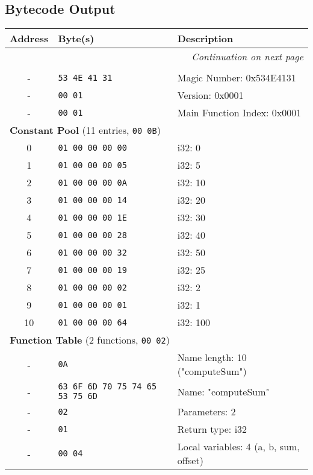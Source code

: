\documentclass[a4paper,12pt]{article}
\begin{document}
\subsection{Bytecode Output}
\begin{longtable}{|c|l|p{6cm}|}
\hline
\textbf{Address} & \textbf{Byte(s)} & \textbf{Description} \\ \hline
\endhead
\multicolumn{3}{r}{\textit{Continuation on next page}} \\
\endfoot
\endlastfoot
\multicolumn{3}{|l|}{\textbf{Header}} \\ \hline
  - & \texttt{53 4E 41 31} & Magic Number: 0x534E4131 \\ \hline
  - & \texttt{00 01} & Version: 0x0001 \\ \hline
  - & \texttt{00 01} & Main Function Index: 0x0001 \\ \hline
\multicolumn{3}{|l|}{\textbf{Constant Pool} (11 entries, \texttt{00 0B})} \\ \hline
  0 & \texttt{01 00 00 00 00} & i32: 0 \\ \hline
  1 & \texttt{01 00 00 00 05} & i32: 5 \\ \hline
  2 & \texttt{01 00 00 00 0A} & i32: 10 \\ \hline
  3 & \texttt{01 00 00 00 14} & i32: 20 \\ \hline
  4 & \texttt{01 00 00 00 1E} & i32: 30 \\ \hline
  5 & \texttt{01 00 00 00 28} & i32: 40 \\ \hline
  6 & \texttt{01 00 00 00 32} & i32: 50 \\ \hline
  7 & \texttt{01 00 00 00 19} & i32: 25 \\ \hline
  8 & \texttt{01 00 00 00 02} & i32: 2 \\ \hline
  9 & \texttt{01 00 00 00 01} & i32: 1 \\ \hline
  10 & \texttt{01 00 00 00 64} & i32: 100 \\ \hline
\multicolumn{3}{|l|}{\textbf{Function Table} (2 functions, \texttt{00 02})} \\ \hline
  - & \texttt{0A} & Name length: 10 ("computeSum") \\ \hline
  - & \texttt{63 6F 6D 70 75 74 65 53 75 6D} & Name: "computeSum" \\ \hline
  - & \texttt{02} & Parameters: 2 \\ \hline
  - & \texttt{01} & Return type: i32 \\ \hline
  - & \texttt{00 04} & Local variables: 4 (a, b, sum, offset) \\ \hline

\end{longtable}
\end{document}
